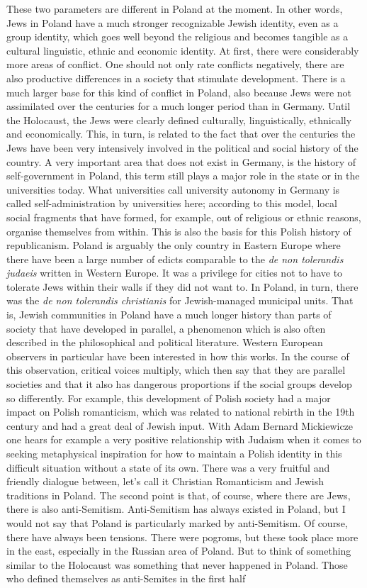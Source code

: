 These two parameters are different in Poland at the moment. In other words, Jews in Poland have a much stronger recognizable Jewish identity, even as a group identity, which goes well beyond the religious and becomes tangible as a cultural linguistic, ethnic and economic identity. At first, there were considerably more areas of conflict. One should not only rate conflicts negatively, there are also productive differences in a society that stimulate development. There is a much larger base for this kind of conflict in Poland, also because Jews were not assimilated over the centuries for a much longer period than in Germany. Until the Holocaust, the Jews were clearly defined culturally, linguistically, ethnically and economically. This, in turn, is related to the fact that over the centuries the Jews have been very intensively involved in the political and social history of the country. A very important area that does not exist in Germany, is the history of self-government in Poland, this term still plays a major role in the state or in the universities today. What universities call university autonomy in Germany is called self-administration by universities here; according to this model, local social fragments that have formed, for example, out of religious or ethnic reasons, organise themselves from within. This is also the basis for this Polish history of republicanism. Poland is arguably the only country in Eastern Europe where there have been a large number of edicts comparable to the \textit{de non tolerandis judaeis} written in Western Europe. It was a privilege for cities not to have to tolerate Jews within their walls if they did not want to. In Poland, in turn, there was the \textit{de non tolerandis christianis} for Jewish-managed municipal units. That is, Jewish communities in Poland have a much longer history than parts of society that have developed in parallel, a phenomenon which is also often described in the philosophical and political literature. Western European observers in particular have been interested in how this works. In the course of this observation, critical voices multiply, which then say that they are parallel societies and that it also has dangerous proportions if the social groups develop so differently. For example, this development of Polish society had a major impact on Polish romanticism, which was related to national rebirth in the 19th century and had a great deal of Jewish input. With Adam Bernard Mickiewicze one hears for example a very positive relationship with Judaism when it comes to seeking metaphysical inspiration for how to maintain a Polish identity in this difficult situation without a state of its own. There was a very fruitful and friendly dialogue between, let's call it Christian Romanticism and Jewish traditions in Poland. The second point is that, of course, where there are Jews, there is also anti-Semitism. Anti-Semitism has always existed in Poland, but I would not say that Poland is particularly marked by anti-Semitism. Of course, there have always been tensions. There were pogroms, but these took place more in the east, especially in the Russian area of Poland. But to think of something similar to the Holocaust was something that never happened in Poland. Those who defined themselves as anti-Semites in the first half 